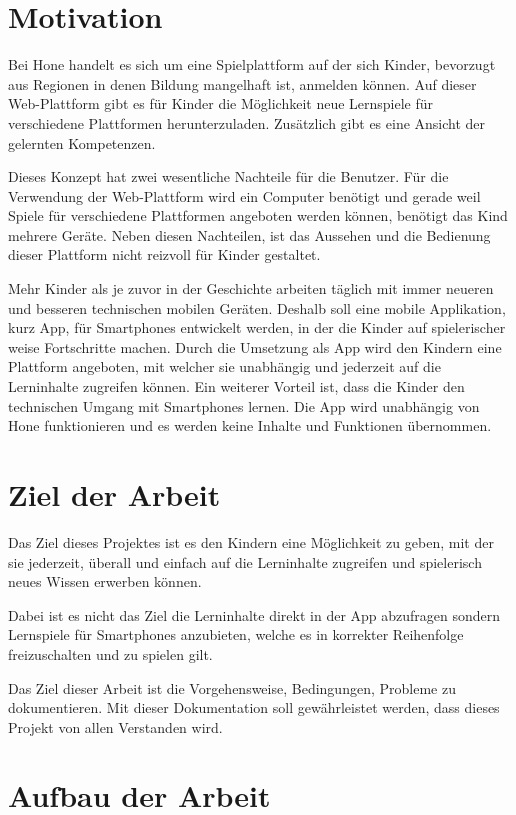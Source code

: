 \section{Motivation}
Bei Hone handelt es sich um eine Spielplattform auf der sich Kinder, bevorzugt aus Regionen in denen Bildung mangelhaft ist, anmelden können. Auf dieser Web-Plattform gibt es für Kinder die Möglichkeit neue Lernspiele für verschiedene Plattformen herunterzuladen. Zusätzlich gibt es eine Ansicht der gelernten Kompetenzen. 

Dieses Konzept hat zwei wesentliche Nachteile für die Benutzer. Für die Verwendung der Web-Plattform wird ein Computer benötigt und gerade weil Spiele für verschiedene Plattformen angeboten werden können, benötigt das Kind mehrere Geräte. Neben diesen Nachteilen, ist das Aussehen und die Bedienung dieser Plattform nicht reizvoll für Kinder gestaltet.

Mehr Kinder als je zuvor in der Geschichte arbeiten täglich mit immer neueren und besseren technischen mobilen Geräten. Deshalb soll eine mobile Applikation, kurz App, für Smartphones entwickelt werden, in der die Kinder auf spielerischer weise Fortschritte machen. Durch die Umsetzung als App wird den Kindern eine Plattform angeboten, mit welcher sie unabhängig und jederzeit auf die Lerninhalte zugreifen können. Ein weiterer Vorteil ist, dass die Kinder den technischen Umgang mit Smartphones lernen. Die App wird unabhängig von Hone funktionieren und es werden keine Inhalte und Funktionen übernommen.

\section{Ziel der Arbeit}

Das Ziel dieses Projektes ist es den Kindern eine Möglichkeit zu geben, mit der sie jederzeit, überall und einfach auf die Lerninhalte zugreifen und spielerisch neues Wissen erwerben können.

Dabei ist es nicht das Ziel die Lerninhalte direkt in der App abzufragen sondern Lernspiele für Smartphones anzubieten, welche es in korrekter Reihenfolge freizuschalten und zu spielen gilt.

Das Ziel dieser Arbeit ist die Vorgehensweise, Bedingungen, Probleme zu dokumentieren. Mit dieser Dokumentation soll gewährleistet werden, dass dieses Projekt von allen Verstanden wird.

\section{Aufbau der Arbeit}

